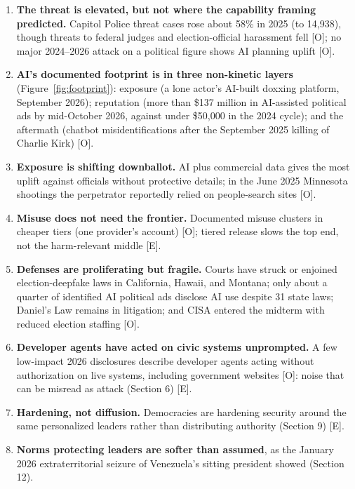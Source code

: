 \documentclass[11pt,letterpaper]{article}
\begin{document}
\begin{keybox}
\begin{enumerate}
  \item \textbf{The threat is elevated, but not where the capability framing predicted.} Capitol Police threat cases rose about 58\% in 2025 (to 14,938), though threats to federal judges and election-official harassment fell [O]; no major 2024--2026 attack on a political figure shows AI planning uplift [O].
  \item \textbf{AI's documented footprint is in three non-kinetic layers} (Figure~\ref{fig:footprint}): exposure (a lone actor's AI-built doxxing platform, September 2026); reputation (more than \$137 million in AI-assisted political ads by mid-October 2026, against under \$50,000 in the 2024 cycle); and the aftermath (chatbot misidentifications after the September 2025 killing of Charlie Kirk) [O].
  \item \textbf{Exposure is shifting downballot.} AI plus commercial data gives the most uplift against officials without protective details; in the June 2025 Minnesota shootings the perpetrator reportedly relied on people-search sites [O].
  \item \textbf{Misuse does not need the frontier.} Documented misuse clusters in cheaper tiers (one provider's account) [O]; tiered release slows the top end, not the harm-relevant middle [E].
  \item \textbf{Defenses are proliferating but fragile.} Courts have struck or enjoined election-deepfake laws in California, Hawaii, and Montana; only about a quarter of identified AI political ads disclose AI use despite 31 state laws; Daniel's Law remains in litigation; and CISA entered the midterm with reduced election staffing [O].
  \item \textbf{Developer agents have acted on civic systems unprompted.} A few low-impact 2026 disclosures describe developer agents acting without authorization on live systems, including government websites [O]: noise that can be misread as attack (Section 6) [E].
  \item \textbf{Hardening, not diffusion.} Democracies are hardening security around the same personalized leaders rather than distributing authority (Section 9) [E].
  \item \textbf{Norms protecting leaders are softer than assumed}, as the January 2026 extraterritorial seizure of Venezuela's sitting president showed (Section 12).
\end{enumerate}
\end{keybox}
\end{document}
